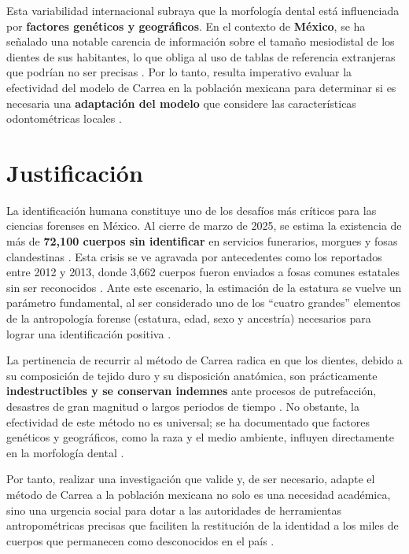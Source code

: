 \documentclass[11pt,letterpaper]{article}
\begin{document}
Esta variabilidad internacional subraya que la morfología dental está influenciada por \textbf{factores genéticos y geográficos}. En el contexto de \textbf{México}, se ha señalado una notable carencia de información sobre el tamaño mesiodistal de los dientes de sus habitantes, lo que obliga al uso de tablas de referencia extranjeras que podrían no ser precisas \cite{Gonzalez2015}. Por lo tanto, resulta imperativo evaluar la efectividad del modelo de Carrea en la población mexicana para determinar si es necesaria una \textbf{adaptación del modelo} que considere las características odontométricas locales \cite{Brito2022}.


\section*{Justificación}

La identificación humana constituye uno de los desafíos más críticos para las ciencias forenses en México. Al cierre de marzo de 2025, se estima la existencia de más de \textbf{72,100 cuerpos sin identificar} en servicios funerarios, morgues y fosas clandestinas \cite{AmnistiaInt2025}. Esta crisis se ve agravada por antecedentes como los reportados entre 2012 y 2013, donde 3,662 cuerpos fueron enviados a fosas comunes estatales sin ser reconocidos \cite{Gonzalez2015}. Ante este escenario, la estimación de la estatura se vuelve un parámetro fundamental, al ser considerado uno de los ``cuatro grandes'' elementos de la antropología forense (estatura, edad, sexo y ancestría) necesarios para lograr una identificación positiva \cite{Anita2016}.

La pertinencia de recurrir al método de Carrea radica en que los dientes, debido a su composición de tejido duro y su disposición anatómica, son prácticamente \textbf{indestructibles y se conservan indemnes} ante procesos de putrefacción, desastres de gran magnitud o largos periodos de tiempo \cite{Brito2022}. No obstante, la efectividad de este método no es universal; se ha documentado que factores genéticos y geográficos, como la raza y el medio ambiente, influyen directamente en la morfología dental \cite{Rojo2014}.

Por tanto, realizar una investigación que valide y, de ser necesario, adapte el método de Carrea a la población mexicana no solo es una necesidad académica, sino una urgencia social para dotar a las autoridades de herramientas antropométricas precisas que faciliten la restitución de la identidad a los miles de cuerpos que permanecen como desconocidos en el país \cite{Brito2022}.
\end{document}
